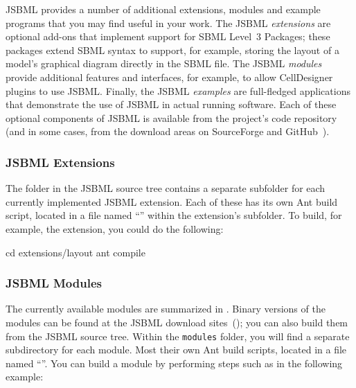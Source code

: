 JSBML provides a number of additional extensions, modules and example
programs that you may find useful in your work.  The JSBML \emph{extensions} are
optional add-ons that implement support for SBML Level~3 Packages; these
packages extend SBML syntax to support, for example, storing the layout of
a model's graphical diagram directly in the SBML file.  The JSBML
\emph{modules} provide additional features and interfaces, for example, to
allow CellDesigner~\cite{Funahashi2003} plugins to use JSBML.  Finally, the
JSBML \emph{examples} are full-fledged applications that demonstrate the
use of JSBML in actual running software.  Each of these optional components
of JSBML is available from the project's code repository (and in some
cases, from the download areas on SourceForge and
GitHub~\cite{JSBMLdownloadSF, JSBMLdownloadGitHub}).


\subsubsection{JSBML Extensions}

The  folder in the JSBML source tree contains a separate
subfolder for each currently implemented JSBML extension.
Each of these has its own Ant build script, located in a file
named ``'' within the extension's
subfolder.  To build, for example, the  extension, you could
do the following:

\begin{example}[style=bash, title={Compiling the JSBML ``\code{layout}'' extension.}]
cd extensions/layout
ant compile
\end{example}

\vspace*{-2ex}

\subsubsection{JSBML Modules}
\label{sec:jsbml-modules}

The currently available modules are summarized in
.  Binary versions of the modules can be
found at the JSBML download sites~(\cite{JSBMLdownloadSF,
  JSBMLdownloadGitHub}); you can also build them from the JSBML
source tree.  Within the \texttt{modules} folder, you will find a
separate subdirectory for each module.  Most their own Ant build
scripts, located in a file named ``''.  You can
build a module by performing steps such as in the following
example:

